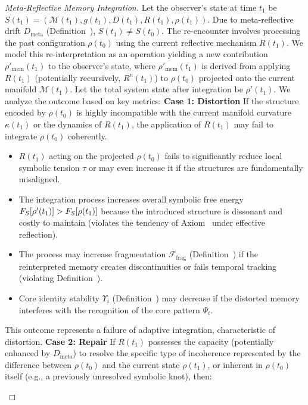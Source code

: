 \begin{proof}[Meta-Reflective Memory Integration]
\label{proof:bk9_meta_reflective_memory_integration}
Let the observer's state at time $t_1$ be $S(t_1) = (\mathcal{M}(t_1), g(t_1), D(t_1), R(t_1), \rho(t_1))$. Due to meta-reflective drift $D_{\text{meta}}$ (Definition~), $S(t_1) \neq S(t_0)$. The re-encounter involves processing the past configuration $\rho(t_0)$ using the current reflective mechanism $R(t_1)$. We model this re-interpretation as an operation yielding a new contribution $\rho'_{\text{mem}}(t_1)$ to the observer's state, where $\rho'_{\text{mem}}(t_1)$ is derived from applying $R(t_1)$ (potentially recursively, $R^n(t_1)$) to $\rho(t_0)$ projected onto the current manifold $\mathcal{M}(t_1)$. Let the total system state after integration be $\rho'(t_1)$.
We analyze the outcome based on key metrics:
\textbf{Case 1: Distortion}
If the structure encoded by $\rho(t_0)$ is highly incompatible with the current manifold curvature $\kappa(t_1)$ or the dynamics of $R(t_1)$, the application of $R(t_1)$ may fail to integrate $\rho(t_0)$ coherently.
\begin{itemize}
    \item $R(t_1)$ acting on the projected $\rho(t_0)$ fails to significantly reduce local symbolic tension $\tau$ or may even increase it if the structures are fundamentally misaligned.
    \item The integration process increases overall symbolic free energy $F_S[\rho'(t_1)] > F_S[\rho(t_1)]$ because the introduced structure is dissonant and costly to maintain (violates the tendency of Axiom~ under effective reflection).
    \item The process may increase fragmentation $\mathcal{F}_{\text{frag}}$ (Definition~) if the reinterpreted memory creates discontinuities or fails temporal tracking (violating Definition~).
    \item Core identity stability $\Upsilon_i$ (Definition~) may decrease if the distorted memory interferes with the recognition of the core pattern $\Psi_i$.
\end{itemize}
This outcome represents a failure of adaptive integration, characteristic of distortion.
\textbf{Case 2: Repair}
If $R(t_1)$ possesses the capacity (potentially enhanced by $D_{\text{meta}}$) to resolve the specific type of incoherence represented by the difference between $\rho(t_0)$ and the current state $\rho(t_1)$, or inherent in $\rho(t_0)$ itself (e.g., a previously unresolved symbolic knot), then:
\begin{itemize}

\end{itemize}
\end{proof}
